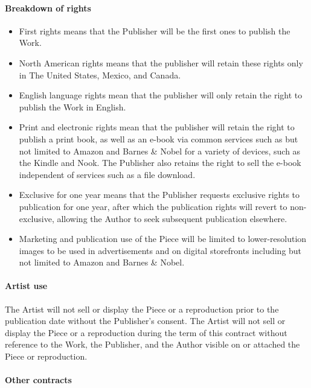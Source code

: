 \documentclass[12pt,letterpaper]{article}
\begin{document}
\paragraph{Breakdown of rights}

\begin{itemize}
    \item First rights means that the Publisher will be the first ones to publish the Work.
    \item North American rights means that the publisher will retain these rights only in The United States, Mexico, and Canada.
    \item English language rights mean that the publisher will only retain the right to publish the Work in English.
    \item Print and electronic rights mean that the publisher will retain the right to publish a print book, as well as an e-book via common services such as but not limited to Amazon and Barnes \& Nobel for a variety of devices, such as the Kindle and Nook. The Publisher also retains the right to sell the e-book independent of services such as a file download.
    \item Exclusive for one year means that the Publisher requests exclusive rights to publication for one year, after which the publication rights will revert to non-exclusive, allowing the Author to seek subsequent publication elsewhere.
    \item Marketing and publication use of the Piece will be limited to lower-resolution images to be used in advertisements and on digital storefronts including but not limited to Amazon and Barnes \& Nobel.
\end{itemize}

\paragraph{Artist use}

The Artist will not sell or display the Piece or a reproduction prior to the publication date without the Publisher's consent. The Artist will not sell or display the Piece or a reproduction during the term of this contract without reference to the Work, the Publisher, and the Author visible on or attached the Piece or reproduction.

\paragraph{Other contracts}
\end{document}
